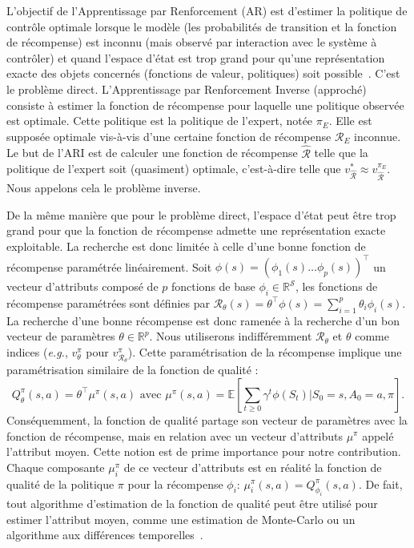 \documentclass[french,utf8]{./hermes-journal}
\newcommand{\R}{\mathcal{R}}
\newcommand{\s}{\mathcal{S}}
\newcommand{\E}{\mathbb{E}}
\begin{document}
L'objectif de l'Apprentissage par Renforcement (AR) est d'estimer la politique de contrôle optimale lorsque le modèle (les probabilités de transition et la fonction de récompense) est inconnu (mais observé par interaction avec le système à contrôler) et quand l'espace d'état est trop grand pour qu'une représentation exacte des objets concernés (fonctions de valeur, politiques) soit possible~\cite{Bertseka996,Sutto998,szepesvari2010c}.
%
C'est le problème direct.
%
L'Apprentissage par Renforcement Inverse (approché)~\cite{N000} consiste à estimer la fonction de récompense pour laquelle une politique observée est optimale.
%
Cette politique est la politique de l'expert, notée $\pi_E$. Elle est supposée optimale vis-à-vis d'une certaine fonction de récompense $\mathcal{R}_E$ inconnue. Le but de l'ARI est de calculer une fonction de récompense $\hat{\R}$ telle que la politique de l'expert soit (quasiment) optimale, c'est-à-dire telle que $v^*_{\hat{\R}}
\approx v^{\pi_E}_{\hat{\R}}$.
%
Nous appelons cela le problème inverse.

De la même manière que pour le problème direct, l'espace d'état peut être trop grand pour que la fonction de récompense admette une représentation exacte exploitable. La recherche est donc limitée à celle d'une bonne fonction de récompense paramétrée linéairement. Soit $\phi(s) = (\phi_1(s)  \dots
\phi_p(s))^\top$
un vecteur d'attributs composé de $p$ fonctions de base $\phi_i\in\mathbb{R}^\s$, les fonctions de récompense paramétrées sont définies par $\R_\theta(s) = \theta^\top \phi(s) = \sum_{i=1}^p
\theta_i \phi_i(s)$.
La recherche d'une bonne récompense est donc ramenée à la recherche d'un bon vecteur de paramètres $\theta \in\mathbb{R}^p$. Nous utiliserons indifféremment $\R_\theta$ et $\theta$ comme indices (\textit{e.g.}, $v_\theta^\pi$ pour $v_{\R_\theta}^\pi$).
Cette paramétrisation de la récompense implique une paramétrisation similaire de la fonction de qualité :
\begin{equation}
  Q^\pi_\theta(s,a) = \theta^\top \mu^\pi(s,a) \text{ avec }
  \mu^\pi(s,a) = \E[\sum_{t\geq 0} \gamma^t
  \phi(S_t)|S_0=s,A_0=a,\pi].
  \label{eeu}
\end{equation}
Conséquemment, la fonction de qualité partage son vecteur de paramètres avec la fonction de récompense, mais en relation avec un vecteur d'attributs $\mu^\pi$ appelé l'attribut moyen. Cette notion est de prime importance pour notre contribution. Chaque composante $\mu_i^\pi$ de ce vecteur d'attributs est en réalité la fonction de qualité de la politique $\pi$ pour la récompense $\phi_i$: $\mu_i^\pi(s,a) = Q^\pi_{\phi_i}(s,a)$. De fait, tout algorithme d'estimation de la fonction de qualité peut être utilisé pour estimer l'attribut moyen, comme une estimation de Monte-Carlo ou un algorithme aux différences temporelles~\cite{Klei011}.
\end{document}

